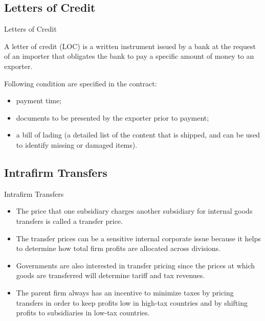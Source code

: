 \documentclass[international_finance_p2.tex]{subfiles}
\begin{document}
\subsection{Letters of Credit}
\begin{frame}{Letters of Credit}
\begin{block}{A letter of credit (LOC)}
\quad is a written instrument issued by a bank at the request of an importer that obligates the bank to pay a specific amount of money to an exporter. 
\end{block}
Following condition are specified in the contract:
\begin{itemize}
\item
payment time;
\item
documents to be presented by the exporter prior to payment;
\item
a bill of lading (a detailed list of the content that is shipped, and can be used to identify missing or damaged items).
\end{itemize}

\end{frame}
\subsection{Intrafirm Transfers}
\begin{frame}{Intrafirm Transfers}
\begin{itemize}[<+->]
\item
The price that one subsidiary charges another subsidiary for internal goods transfers is called a transfer price. 
\item
The transfer prices can be a sensitive internal corporate issue because it helps to determine how total firm profits are allocated across divisions. 
\item
Governments are also interested in transfer pricing since the prices at which goods are transferred will determine tariff and tax revenues.
\item
The parent firm always has an incentive to minimize taxes by pricing transfers in order to keep profits low in high-tax countries and by shifting profits to subsidiaries in low-tax countries.
\end{itemize}
\end{frame}
\end{document}

